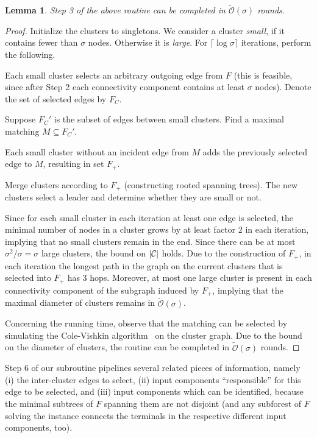 \documentclass[letterpaper,11pt]{article}
\newtheorem{lemma}[theorem]{Lemma}
\newcommand{\sO}{\tilde{\mathcal{O}}}
\begin{document}
\begin{lemma}\label{lemma:prune_3}
Step 3 of the above routine can be completed in $\sO(\sigma)$ rounds.
\end{lemma}
\begin{proof}
Initialize the clusters to singletons. We consider a cluster \emph{small}, if it
contains fewer than $\sigma$ nodes. Otherwise it is \emph{large}. For $\lceil
\log \sigma\rceil$ iterations, perform the following.
\begin{compactenum}
\item Each small cluster selects an arbitrary outgoing edge from $F$ (this is
feasible, since after Step 2 each connectivity component contains at least
$\sigma$ nodes). Denote the set of selected edges by $F_C$.
\item Suppose $F_C'$ is the subset of edges between small clusters. Find a
maximal matching $M\subseteq F_C'$.
\item Each small cluster without an incident edge from $M$ adds the previously
selected edge to $M$, resulting in set $F_+$.
\item Merge clusters according to $F_+$ (constructing rooted spanning trees).
The new clusters select a leader and determine whether they are small or not.
\end{compactenum}
Since for each small cluster in each iteration at least one edge is selected,
the minimal number of nodes in a cluster grows by at least factor $2$ in each
iteration, implying that no small clusters remain in the end. Since there can be
at most $\sigma^2/\sigma=\sigma$ large clusters, the bound on $|{\cal C}|$
holds. Due to the construction of $F_+$, in each iteration the longest path in
the graph on the current clusters that is selected into $F_+$ has $3$ hops.
Moreover, at most one large cluster is present in each connectivity component of
the subgraph induced by $F_+$, implying that the maximal diameter of clusters
remains in $\sO(\sigma)$.

Concerning the running time, observe that the matching can be selected by
simulating the Cole-Vishkin algorithm~\cite{CV-86} on the cluster graph. Due to
the bound on the diameter of clusters, the routine can be completed in
$\sO(\sigma)$ rounds.
\end{proof}

Step 6 of our subroutine pipelines several related pieces of information, namely
(i) the inter-cluster edges to select, (ii) input components ``responsible'' for
this edge to be selected, and (iii) input components which can be identified,
because the minimal subtrees of $F$ spanning them are not disjoint (and any
subforest of $F$ solving the instance connects the terminals in the respective
different input components, too).
\end{document}
